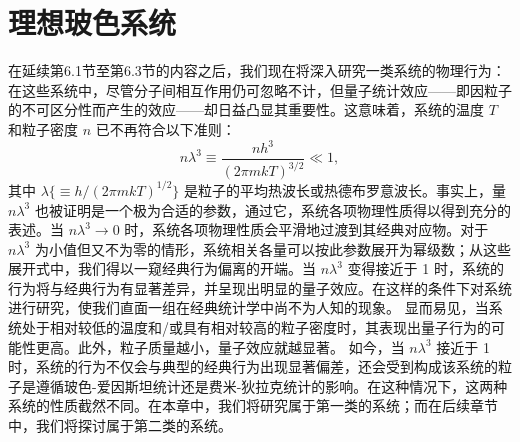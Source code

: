 ﻿\chapter{理想玻色系统}\label{ux7406ux60f3ux73bbux8272ux7cfbux7edf}
在延续第6.1节至第6.3节的内容之后，我们现在将深入研究一类系统的物理行为：在这些系统中，尽管分子间相互作用仍可忽略不计，但量子统计效应——即因粒子的不可区分性而产生的效应——却日益凸显其重要性。这意味着，系统的温度 \(T\) 和粒子密度 \(n\) 已不再符合以下准则：
\begin{equation}\tag{7.1.1}\label{eq:7.1.1}
n \lambda ^{3} \equiv \frac { n h ^{3} } { ( 2 \pi m k T ) ^{3 / 2} } \ll 1 ,
\end{equation}
其中 \(\lambda\{ \equiv h/(2\pi mkT)^{1/2}\}\) 是粒子的平均热波长或热德布罗意波长。事实上，量 \(n\lambda^{3}\) 也被证明是一个极为合适的参数，通过它，系统各项物理性质得以得到充分的表述。当 \(n\lambda^{3} \rightarrow 0\) 时，系统各项物理性质会平滑地过渡到其经典对应物。对于 \(n\lambda^{3}\) 为小值但又不为零的情形，系统相关各量可以按此参数展开为幂级数；从这些展开式中，我们得以一窥经典行为偏离的开端。当 \(n\lambda^{3}\) 变得接近于 1 时，系统的行为将与经典行为有显著差异，并呈现出明显的量子效应。在这样的条件下对系统进行研究，使我们直面一组在经典统计学中尚不为人知的现象。
显而易见，当系统处于相对较低的温度和/或具有相对较高的粒子密度时，其表现出量子行为的可能性更高。此外，粒子质量越小，量子效应就越显著。
如今，当 \(n\lambda^{3}\) 接近于 1 时，系统的行为不仅会与典型的经典行为出现显著偏差，还会受到构成该系统的粒子是遵循玻色-爱因斯坦统计还是费米-狄拉克统计的影响。在这种情况下，这两种系统的性质截然不同。在本章中，我们将研究属于第一类的系统；而在后续章节中，我们将探讨属于第二类的系统。
